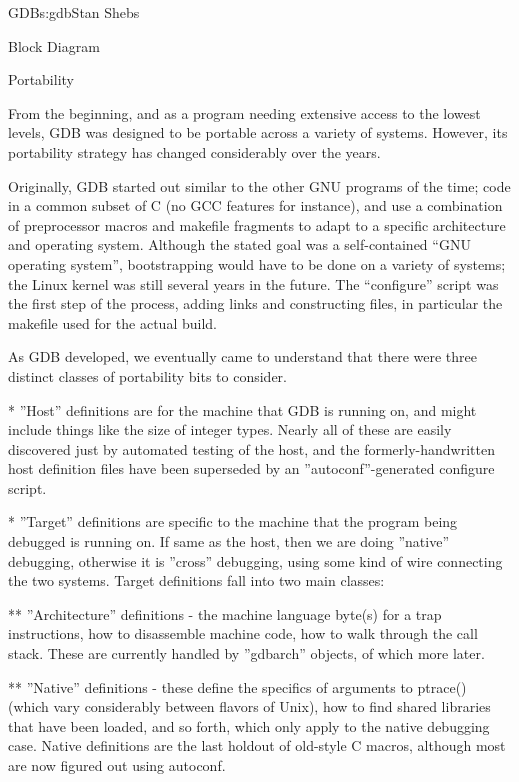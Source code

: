\begin{aosachapter}{GDB}{s:gdb}{Stan Shebs}
\begin{aosasect1}{Block Diagram}
\end{aosasect1}

\begin{aosasect1}{Portability}

From the beginning, and as a program needing extensive access to the
lowest levels, GDB was designed to be portable across a variety of
systems.  However, its portability strategy has changed considerably
over the years.

Originally, GDB started out similar to the other GNU programs of the
time; code in a common subset of C (no GCC features for instance), and
use a combination of preprocessor macros and makefile fragments to
adapt to a specific architecture and operating system.  Although the
stated goal was a self-contained ``GNU operating system'',
bootstrapping would have to be done on a variety of systems; the Linux
kernel was still several years in the future.  The ``configure'' script
was the first step of the process, adding links and constructing files,
in particular the makefile used for the actual build.

As GDB developed, we eventually came to understand that there were three
distinct classes of portability bits to consider.

* ''Host'' definitions are for the machine that GDB is running on, and
might include things like the size of integer types.  Nearly all of these
are easily discovered just by automated testing of the host, and the
formerly-handwritten host definition files have been superseded by
an ''autoconf''-generated configure script.

* ''Target'' definitions are specific to the machine that the program
being debugged is running on.  If same as the host, then we are doing
''native'' debugging, otherwise it is ''cross'' debugging, using some
kind of wire connecting the two systems.  Target definitions fall into
two main classes:

** ''Architecture'' definitions - the machine language byte(s) for a
trap instructions, how to disassemble machine code, how to walk
through the call stack.  These are currently handled by ''gdbarch''
objects, of which more later.

** ''Native'' definitions - these define the specifics of arguments to
ptrace() (which vary considerably between flavors of Unix), how to
find shared libraries that have been loaded, and so forth, which only
apply to the native debugging case.  Native definitions are the last
holdout of old-style C macros, although most are now figured out using
autoconf.


\end{aosasect1}
\end{aosachapter}

